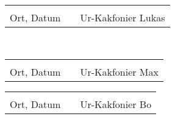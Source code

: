 \documentclass[ngerman, fontsize=12pt, parskip=half, footsepline]{scrartcl}
\begin{document}
\vspace{1cm}
\begin{tabular}{lp{2em}l}
 \hspace{5cm}   && \hspace{4cm} \\\cline{1-1}\cline{3-3}
 Ort, Datum     && Ur-Kakfonier Lukas
\end{tabular}\\

\vspace{1.5cm}
\begin{tabular}{lp{2em}l}
 \hspace{5cm}   && \hspace{4cm} \\\cline{1-1}\cline{3-3}
 Ort, Datum     && Ur-Kakfonier Max
\end{tabular}

\vspace{1.5cm}
\begin{tabular}{lp{2em}l}
 \hspace{5cm}   && \hspace{4cm} \\\cline{1-1}\cline{3-3}
 Ort, Datum     && Ur-Kakfonier Bo
\end{tabular}
\end{document}
